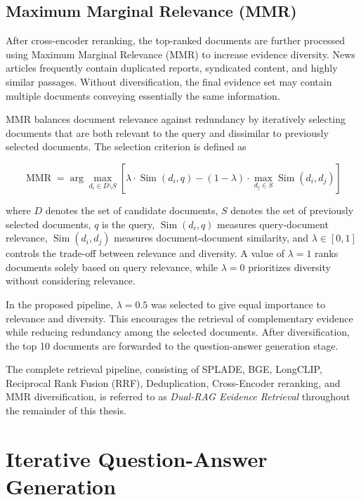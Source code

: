 \subsection{Maximum Marginal Relevance (MMR)}

After cross-encoder reranking, the top-ranked documents are further processed using Maximum Marginal Relevance (MMR) to increase evidence diversity. News articles frequently contain duplicated reports, syndicated content, and highly similar passages. Without diversification, the final evidence set may contain multiple documents conveying essentially the same information.

MMR balances document relevance against redundancy by iteratively selecting documents that are both relevant to the query and dissimilar to previously selected documents. The selection criterion is defined as

\begin{equation}
\operatorname{MMR}
=
\arg\max_{d_i \in D \setminus S}
\left[
\lambda \cdot \operatorname{Sim}(d_i,q)
-
(1-\lambda)
\cdot
\max_{d_j \in S}
\operatorname{Sim}(d_i,d_j)
\right]
\label{eq:mmr}
\end{equation}

where $D$ denotes the set of candidate documents, $S$ denotes the set of previously selected documents, $q$ is the query, $\operatorname{Sim}(d_i,q)$ measures query-document relevance, $\operatorname{Sim}(d_i,d_j)$ measures document-document similarity, and  $\lambda \in [0,1]$ controls the trade-off between relevance and diversity. A value of $\lambda=1$ ranks documents solely based on query relevance, while $\lambda=0$ prioritizes diversity without considering relevance.

In the proposed pipeline, $\lambda=0.5$ was selected to give equal importance to relevance and diversity. This encourages the retrieval of complementary evidence while reducing redundancy among the selected documents. After diversification, the top 10 documents are forwarded to the question-answer generation stage.

The complete retrieval pipeline, consisting of SPLADE, BGE, LongCLIP, Reciprocal Rank Fusion (RRF), Deduplication, Cross-Encoder reranking, and MMR diversification, is referred to as \textit{Dual-RAG Evidence Retrieval} throughout the remainder of this thesis.



\section {Iterative Question-Answer Generation}
\label{section:iterative}


